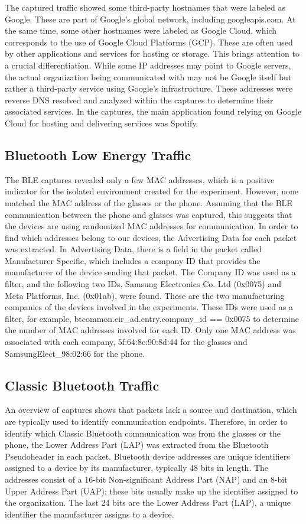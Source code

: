 The captured traffic showed some third-party hostnames that were labeled as Google. These are part of Google's global network, including googleapis.com. At the same time, some other hostnames were labeled as Google Cloud, which corresponds to the use of Google Cloud Platforms (GCP). These are often used by other applications and services for hosting or storage. This brings attention to a crucial differentiation. While some IP addresses may point to Google servers, the actual organization being communicated with may not be Google itself but rather a third-party service using Google's infrastructure. These addresses were reverse DNS resolved and analyzed within the captures to determine their associated services. In the captures, the main application found relying on Google Cloud for hosting and delivering services was Spotify. 


\subsection*{Bluetooth Low Energy Traffic}
The BLE captures revealed only a few MAC addresses, which is a positive indicator for the isolated environment created for the experiment. However, none matched the MAC address of the glasses or the phone. Assuming that the BLE communication between the phone and glasses was captured, this suggests that the devices are using randomized MAC addresses for communication. In order to find which addresses belong to our devices, the Advertising Data for each packet was extracted. In Advertising Data, there is a field in the packet called Manufacturer Specific, which includes a company ID that provides the manufacturer of the device sending that packet. The Company ID was used as a filter, and the following two IDs, Samsung Electronics Co. Ltd (0x0075) and Meta Platforms, Inc. (0x01ab), were found. These are the two manufacturing companies of the devices involved in the experiments. These IDs were used as a filter, for example, btcommon.eir\_ad.entry.company\_id == 0x0075 to determine the number of MAC addresses involved for each ID. Only one MAC address was associated with each company, 5f:64:8e:90:8d:44 for the glasses and SamsungElect\_98:02:66 for the phone.


\subsection*{Classic Bluetooth Traffic}
An overview of captures shows that packets lack a source and destination, which are typically used to identify communication endpoints. Therefore, in order to identify which Classic Bluetooth communication was from the glasses or the phone, the Lower Address Part (LAP) was extracted from the Bluetooth Pseudoheader in each packet. Bluetooth device addresses are unique identifiers assigned to a device by its manufacturer, typically 48 bits in length. The addresses consist of a 16-bit Non-significant Address Part (NAP) and an 8-bit Upper Address Part (UAP); these bits usually make up the identifier assigned to the organization. The last 24 bits are the Lower Address Part (LAP), a unique identifier the manufacturer assigns to a device. 

